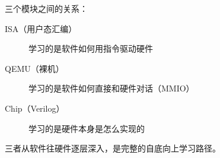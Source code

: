 
三个模块之间的关系：

\begin{description}
    \item[ISA（用户态汇编）] 学习的是软件如何用指令驱动硬件
    \item[QEMU（裸机）] 学习的是软件如何直接和硬件对话（MMIO）
    \item[Chip（Verilog）] 学习的是硬件本身是怎么实现的
\end{description}

三者从软件往硬件逐层深入，是完整的自底向上学习路径。

